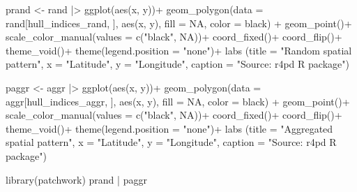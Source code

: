 \documentclass[
  letterpaper,
]{book}
\newenvironment{Shaded}{\begin{snugshade}}{\end{snugshade}}
\newcommand{\AttributeTok}[1]{\textcolor[rgb]{0.40,0.45,0.13}{#1}}
\newcommand{\ConstantTok}[1]{\textcolor[rgb]{0.56,0.35,0.01}{#1}}
\newcommand{\FunctionTok}[1]{\textcolor[rgb]{0.28,0.35,0.67}{#1}}
\newcommand{\NormalTok}[1]{\textcolor[rgb]{0.00,0.23,0.31}{#1}}
\newcommand{\OtherTok}[1]{\textcolor[rgb]{0.00,0.23,0.31}{#1}}
\newcommand{\SpecialCharTok}[1]{\textcolor[rgb]{0.37,0.37,0.37}{#1}}
\newcommand{\StringTok}[1]{\textcolor[rgb]{0.13,0.47,0.30}{#1}}
\begin{document}
\begin{Shaded}
\begin{Highlighting}[]
\NormalTok{prand }\OtherTok{\textless{}{-}}\NormalTok{ rand }\SpecialCharTok{|\textgreater{}} 
  \FunctionTok{ggplot}\NormalTok{(}\FunctionTok{aes}\NormalTok{(x, y))}\SpecialCharTok{+}
  \FunctionTok{geom\_polygon}\NormalTok{(}\AttributeTok{data =}\NormalTok{ rand[hull\_indices\_rand, ], }\FunctionTok{aes}\NormalTok{(x, y), }\AttributeTok{fill =} \ConstantTok{NA}\NormalTok{, }\AttributeTok{color =} \StringTok{\textquotesingle{}black\textquotesingle{}}\NormalTok{) }\SpecialCharTok{+}
  \FunctionTok{geom\_point}\NormalTok{()}\SpecialCharTok{+}
  \FunctionTok{scale\_color\_manual}\NormalTok{(}\AttributeTok{values =} \FunctionTok{c}\NormalTok{(}\StringTok{"black"}\NormalTok{, }\ConstantTok{NA}\NormalTok{))}\SpecialCharTok{+}
  \FunctionTok{coord\_fixed}\NormalTok{()}\SpecialCharTok{+}
  \FunctionTok{coord\_flip}\NormalTok{()}\SpecialCharTok{+}
  \FunctionTok{theme\_void}\NormalTok{()}\SpecialCharTok{+}
  \FunctionTok{theme}\NormalTok{(}\AttributeTok{legend.position =} \StringTok{"none"}\NormalTok{)}\SpecialCharTok{+}
  \FunctionTok{labs}\NormalTok{ (}\AttributeTok{title =} \StringTok{"Random spatial pattern"}\NormalTok{, }
        \AttributeTok{x =} \StringTok{"Latitude"}\NormalTok{,}
        \AttributeTok{y =} \StringTok{"Longitude"}\NormalTok{,}
        \AttributeTok{caption =} \StringTok{"Source: r4pd R package"}\NormalTok{)}

\NormalTok{paggr }\OtherTok{\textless{}{-}}\NormalTok{ aggr }\SpecialCharTok{|\textgreater{}} 
  \FunctionTok{ggplot}\NormalTok{(}\FunctionTok{aes}\NormalTok{(x, y))}\SpecialCharTok{+}
  \FunctionTok{geom\_polygon}\NormalTok{(}\AttributeTok{data =}\NormalTok{ aggr[hull\_indices\_aggr, ], }\FunctionTok{aes}\NormalTok{(x, y), }\AttributeTok{fill =} \ConstantTok{NA}\NormalTok{, }\AttributeTok{color =} \StringTok{\textquotesingle{}black\textquotesingle{}}\NormalTok{) }\SpecialCharTok{+}
  \FunctionTok{geom\_point}\NormalTok{()}\SpecialCharTok{+}
  \FunctionTok{scale\_color\_manual}\NormalTok{(}\AttributeTok{values =} \FunctionTok{c}\NormalTok{(}\StringTok{"black"}\NormalTok{, }\ConstantTok{NA}\NormalTok{))}\SpecialCharTok{+}
  \FunctionTok{coord\_fixed}\NormalTok{()}\SpecialCharTok{+}
  \FunctionTok{coord\_flip}\NormalTok{()}\SpecialCharTok{+}
  \FunctionTok{theme\_void}\NormalTok{()}\SpecialCharTok{+}
  \FunctionTok{theme}\NormalTok{(}\AttributeTok{legend.position =} \StringTok{"none"}\NormalTok{)}\SpecialCharTok{+}
  \FunctionTok{labs}\NormalTok{ (}\AttributeTok{title =} \StringTok{"Aggregated spatial pattern"}\NormalTok{, }
        \AttributeTok{x =} \StringTok{"Latitude"}\NormalTok{,}
        \AttributeTok{y =} \StringTok{"Longitude"}\NormalTok{,}
        \AttributeTok{caption =} \StringTok{"Source: r4pd R package"}\NormalTok{)}

\FunctionTok{library}\NormalTok{(patchwork)}
\NormalTok{prand }\SpecialCharTok{|}\NormalTok{ paggr}
\end{Highlighting}
\end{Shaded}
\end{document}
